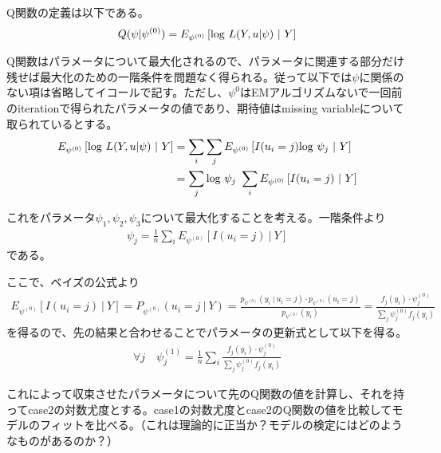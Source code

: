 \documentclass{jsarticle}
\begin{document}
Q関数の定義は以下である。
\begin{align*}
	Q(\psi | \psi^{(0)}) = E_{\psi^{(0)}}\left[ {\rm log}\ L(Y, u | \psi)\ |\ Y \right]
\end{align*}

Q関数はパラメータについて最大化されるので、パラメータに関連する部分だけ残せば最大化のための一階条件を問題なく得られる。従って以下では$\psi$に関係のない項は省略してイコールで記す。ただし、$\psi^{0}$はEMアルゴリズムないで一回前のiterationで得られたパラメータの値であり、期待値はmissing variableについて取られているとする。
\begin{align}
	E_{\psi^{(0)}}\left[ {\rm log}\ L(Y, u | \psi)\ |\ Y \right] &= \sum_i \sum_j E_{\psi^{(0)}}\left[ I(u_i = j) {\rm log}\ \psi_j\ |\ Y \right]\nonumber \\
	&= \sum_j {\rm log}\ \psi_j\ \sum_i E_{\psi^{(0)}}\left[ I(u_i = j)\ |\ Y \right]
\end{align}

これをパラメータ$\psi_1, \psi_2, \psi_3$について最大化することを考える。一階条件より
\begin{align}
	\psi_j = \frac{1}{n} \sum_i E_{\psi^{(0)}}\left[ I(u_i = j)\ |\ Y \right]
\end{align}
である。

ここで、ベイズの公式より
\begin{align*}
	E_{\psi^{(0)}}\left[ I(u_i = j)\ |\ Y \right] = P_{\psi^{(0)}}( u_i = j\ |\ Y ) = \frac{p_{\psi^{(0)}} (y_i\ |\ u_i = j) \cdot p_{\psi^{(0)}} (u_i = j)}{p_{\psi^{(0)}} (y_i)} = \frac{f_j(y_i) \cdot \psi_j^{(0)}}{\sum_j \psi_j^{(0)} f_j(y_i)}
\end{align*}
を得るので、先の結果と合わせることでパラメータの更新式として以下を得る。
\begin{align}
	\forall j \quad \psi_j^{(1)} = \frac{1}{n} \sum_i \frac{f_j(y_i) \cdot \psi_j^{(0)}}{\sum_j \psi_j^{(0)} f_j(y_i)}
\end{align}

これによって収束させたパラメータについて先のQ関数の値を計算し、それを持ってcase2の対数尤度とする。case1の対数尤度とcase2のQ関数の値を比較してモデルのフィットを比べる。（これは理論的に正当か？モデルの検定にはどのようなものがあるのか？）
\end{document}
